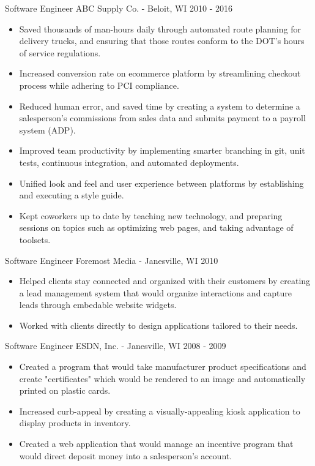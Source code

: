 \documentclass[]{clean-resume}
\begin{document}
\entry
	{Software Engineer}
	{ABC Supply Co. - Beloit, WI}
	{2010 - 2016}
	{
		\begin{itemize}
			\item Saved thousands of man-hours daily through automated route planning for delivery trucks, and ensuring that those routes conform to the DOT's hours of service regulations.
		
			\item Increased conversion rate on ecommerce platform by streamlining checkout process while adhering to PCI compliance.
			
			\item Reduced human error, and saved time by creating a system to determine a salesperson's commissions from sales data and submits payment to a payroll system (ADP).
		
			\item Improved team productivity by implementing smarter branching in git, unit tests, continuous integration, and automated deployments.
		
			\item Unified look and feel and user experience between platforms by establishing and executing a style guide.
		
			\item Kept coworkers up to date by teaching new technology, and preparing sessions on topics such as optimizing web pages, and taking advantage of toolsets.
		\end{itemize}
		
	}

\entry
	{Software Engineer}
	{Foremost Media - Janesville, WI}
	{2010}
	{
		\begin{itemize}
			\item Helped clients stay connected and organized with their customers by creating a lead management system that would organize interactions and capture leads through embedable website widgets.
			\item Worked with clients directly to design applications tailored to their needs.
		\end{itemize}
		
	}

\newpage

\entry
	{Software Engineer}
	{ESDN, Inc. - Janesville, WI}
	{2008 - 2009}
	{
		\begin{itemize}
			\item Created a program that would take manufacturer product specifications and create "certificates" which would be rendered to an image and automatically printed on plastic cards.
			\item Increased curb-appeal by creating a visually-appealing kiosk application to display products in inventory.
			\item Created a web application that would manage an incentive program that would direct deposit money into a salesperson's account.
		\end{itemize}
		
	}
\end{document}
